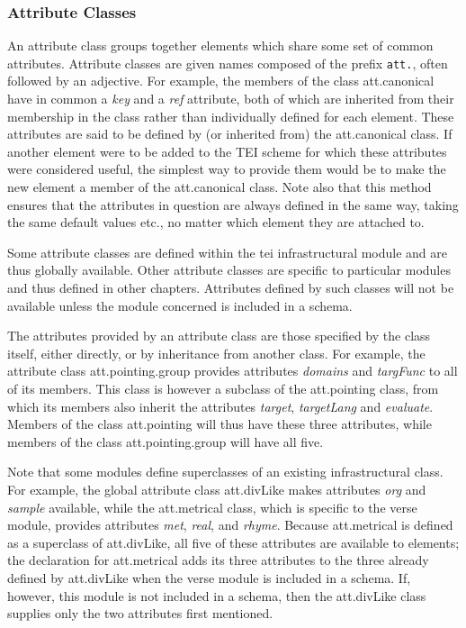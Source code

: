 \subsubsection[{Attribute Classes}]{Attribute Classes}\label{STECAT}\par
An attribute class groups together elements which share some set of common attributes. Attribute classes are given names composed of the prefix \texttt{att.}, often followed by an adjective. For example, the members of the class \textsf{att.canonical} have in common a {\itshape key} and a {\itshape ref} attribute, both of which are inherited from their membership in the class rather than individually defined for each element. These attributes are said to be defined by (or inherited from) the \textsf{att.canonical} class. If another element were to be added to the TEI scheme for which these attributes were considered useful, the simplest way to provide them would be to make the new element a member of the \textsf{att.canonical} class. Note also that this method ensures that the attributes in question are always defined in the same way, taking the same default values etc., no matter which element they are attached to.\par
Some attribute classes are defined within the \textsf{tei} infrastructural module and are thus globally available. Other attribute classes are specific to particular modules and thus defined in other chapters. Attributes defined by such classes will not be available unless the module concerned is included in a schema.\par
The attributes provided by an attribute class are those specified by the class itself, either directly, or by inheritance from another class. For example, the attribute class \textsf{att.pointing.group} provides attributes {\itshape domains} and {\itshape targFunc} to all of its members. This class is however a subclass of the \textsf{att.pointing} class, from which its members also inherit the attributes {\itshape target}, {\itshape targetLang} and {\itshape evaluate}. Members of the class \textsf{att.pointing} will thus have these three attributes, while members of the class \textsf{att.pointing.group} will have all five.\par
Note that some modules define superclasses of an existing infrastructural class. For example, the global attribute class \textsf{att.divLike} makes attributes {\itshape org} and {\itshape sample} available, while the \textsf{att.metrical} class, which is specific to the \textsf{verse} module, provides attributes {\itshape met}, {\itshape real}, and {\itshape rhyme}. Because \textsf{att.metrical} is defined as a superclass of \textsf{att.divLike}, all five of these attributes are available to elements; the declaration for \textsf{att.metrical} adds its three attributes to the three already defined by \textsf{att.divLike} when the \textsf{verse} module is included in a schema. If, however, this module is not included in a schema, then the \textsf{att.divLike} class supplies only the two attributes first mentioned.\par
